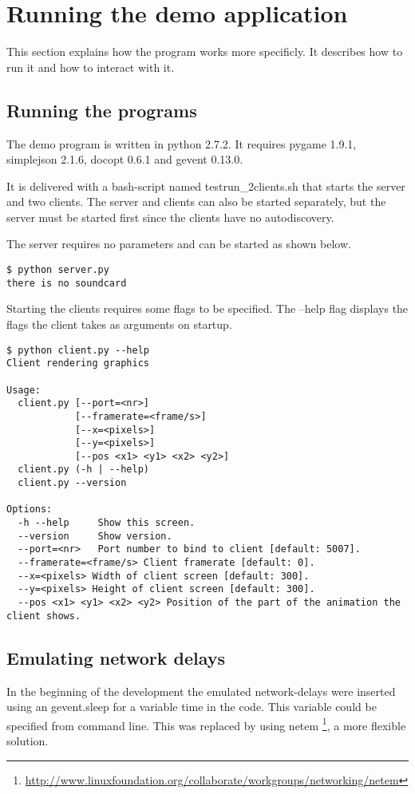 \chapter{Running the demo application}

This section explains how the program works more specificly. It describes how to run it and how to interact with it. 

\section{Running the programs}
The demo program is written in python 2.7.2. It requires pygame 1.9.1, simplejson 2.1.6, docopt 0.6.1 and gevent 0.13.0. 

It is delivered with a bash-script named testrun\_2clients.sh that starts the server and two clients. The server and clients can also be started separately, but the server must be started first since the clients have no autodiscovery. 

The server requires no parameters and can be started as shown below. 

\begin{verbatim}
$ python server.py
there is no soundcard
\end{verbatim}

Starting the clients requires some flags to be specified. The --help flag displays the flags the client takes as arguments on startup. 

\begin{verbatim}
$ python client.py --help
Client rendering graphics

Usage:
  client.py [--port=<nr>]
            [--framerate=<frame/s>]
            [--x=<pixels>]
            [--y=<pixels>]
            [--pos <x1> <y1> <x2> <y2>]
  client.py (-h | --help)
  client.py --version

Options:
  -h --help     Show this screen.
  --version     Show version.
  --port=<nr>   Port number to bind to client [default: 5007].
  --framerate=<frame/s> Client framerate [default: 0].
  --x=<pixels> Width of client screen [default: 300].
  --y=<pixels> Height of client screen [default: 300].
  --pos <x1> <y1> <x2> <y2> Position of the part of the animation the client shows.
\end{verbatim}


\section{Emulating network delays}
In the beginning of the development the emulated network-delays were inserted using an gevent.sleep for a variable time in the code. This variable could be specified from command line. This was replaced by using netem \footnote{\url{http://www.linuxfoundation.org/collaborate/workgroups/networking/netem}}, a more flexible solution. 

